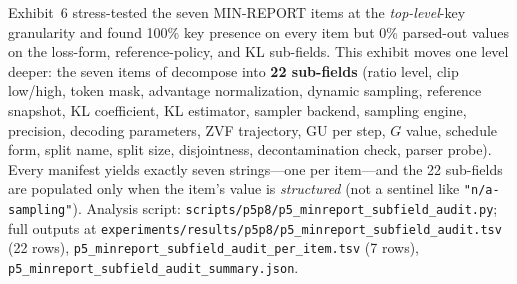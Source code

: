 Exhibit~6 stress-tested the seven MIN-REPORT items at the
\emph{top-level}-key granularity and found 100\% key presence on every
item but 0\% parsed-out values on the loss-form, reference-policy, and
KL sub-fields. This exhibit moves one level deeper: the seven items of
 decompose into \textbf{22 sub-fields}
(ratio level, clip low/high, token mask, advantage normalization, dynamic
sampling, reference snapshot, KL coefficient, KL estimator, sampler
backend, sampling engine, precision, decoding parameters, ZVF trajectory,
GU per step, $G$ value, schedule form, split name, split size,
disjointness, decontamination check, parser probe). Every manifest
yields exactly seven strings---one per item---and the 22 sub-fields are
populated only when the item's value is \emph{structured} (not a
sentinel like \texttt{"n/a-sampling"}). Analysis script:
\texttt{scripts/p5p8/p5\_minreport\_subfield\_audit.py}; full outputs at
\texttt{experiments/results/p5p8/p5\_minreport\_subfield\_audit.tsv}
(22 rows), \texttt{p5\_minreport\_subfield\_audit\_per\_item.tsv}
(7 rows), \texttt{p5\_minreport\_subfield\_audit\_summary.json}.


